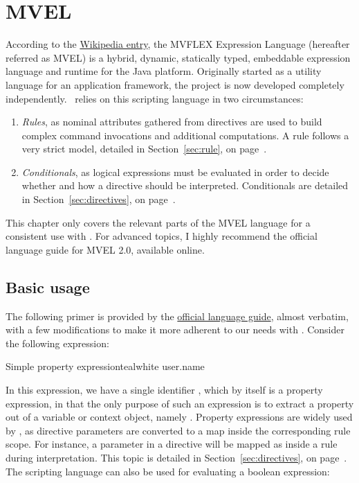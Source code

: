 \chapter{MVEL}
\label{chap:mvel}

According to the \href{https://en.wikipedia.org/wiki/MVEL}{Wikipedia entry}, the MVFLEX Expression Language (hereafter referred as MVEL) is a hybrid, dynamic, statically typed, embeddable expression language and runtime for the Java platform. Originally started as a utility language for an application framework, the project is now developed completely independently. \arara\ relies on this scripting language in two circumstances:

\begin{enumerate}
\item\emph{Rules}, as nominal attributes gathered from directives are used to build complex command invocations and additional computations. A rule follows a very strict model, detailed in Section~\ref{sec:rule}, on page~\pageref{sec:rule}.

\item\emph{Conditionals}, as logical expressions must be evaluated in order to decide whether and how a directive should be interpreted. Conditionals are detailed in Section~\ref{sec:directives}, on page~\pageref{sec:directives}.
\end{enumerate}

This chapter only covers the relevant parts of the MVEL language for a consistent use with \arara. For advanced topics, I highly recommend the official language guide for MVEL 2.0, available online.

\section{Basic usage}
\label{sec:mvelbasicusage}

The following primer is provided by the \href{https://mvel.documentnode.com/}{official language guide}, almost verbatim, with a few modifications to make it more adherent to our needs with \arara. Consider the following expression:

\begin{codebox}{Simple property expression}{teal}{\icnote}{white}
user.name
\end{codebox}

In this expression, we have a single identifier , which by itself is a property expression, in that the only purpose of such an expression is to extract a property out of a variable or context object, namely . Property expressions are widely used by \arara, as directive parameters are converted to a map inside the corresponding rule scope. For instance, a parameter  in a directive will be mapped as  inside a rule during interpretation. This topic is detailed in Section~\ref{sec:directives}, on page~\pageref{sec:directives}. The scripting language can also be used for evaluating a boolean expression:

